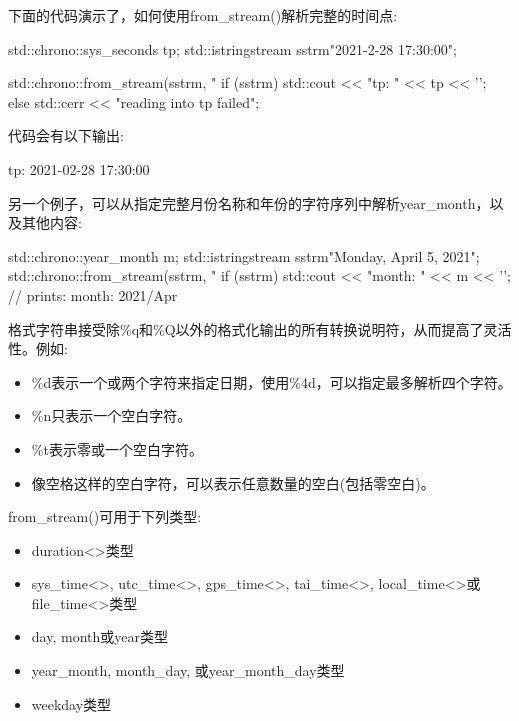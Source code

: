 
下面的代码演示了，如何使用from\_stream()解析完整的时间点:

\begin{cpp}
std::chrono::sys_seconds tp;
std::istringstream sstrm{"2021-2-28 17:30:00"};

std::chrono::from_stream(sstrm, "%
if (sstrm) {
	std::cout << "tp: " << tp << '\n';
}
else {
	std::cerr << "reading into tp failed\n";
}
\end{cpp}

代码会有以下输出:

\begin{shell}
tp: 2021-02-28 17:30:00
\end{shell}

另一个例子，可以从指定完整月份名称和年份的字符序列中解析year\_month，以及其他内容:

\begin{cpp}
std::chrono::year_month m;
std::istringstream sstrm{"Monday, April 5, 2021"};
std::chrono::from_stream(sstrm, "%
if (sstrm) {
	std::cout << "month: " << m << '\n'; // prints: month: 2021/Apr
}
\end{cpp}

格式字符串接受除\%q和\%Q以外的格式化输出的所有转换说明符，从而提高了灵活性。例如:

\begin{itemize}
\item
\%d表示一个或两个字符来指定日期，使用\%4d，可以指定最多解析四个字符。

\item
\%n只表示一个空白字符。

\item
\%t表示零或一个空白字符。

\item
像空格这样的空白字符，可以表示任意数量的空白(包括零空白)。
\end{itemize}

from\_stream()可用于下列类型:

\begin{itemize}
\item
duration<>类型

\item
sys\_time<>, utc\_time<>, gps\_time<>, tai\_time<>, local\_time<>或file\_time<>类型

\item
day, month或year类型

\item
year\_month, month\_day, 或year\_month\_day类型

\item
weekday类型
\end{itemize}

